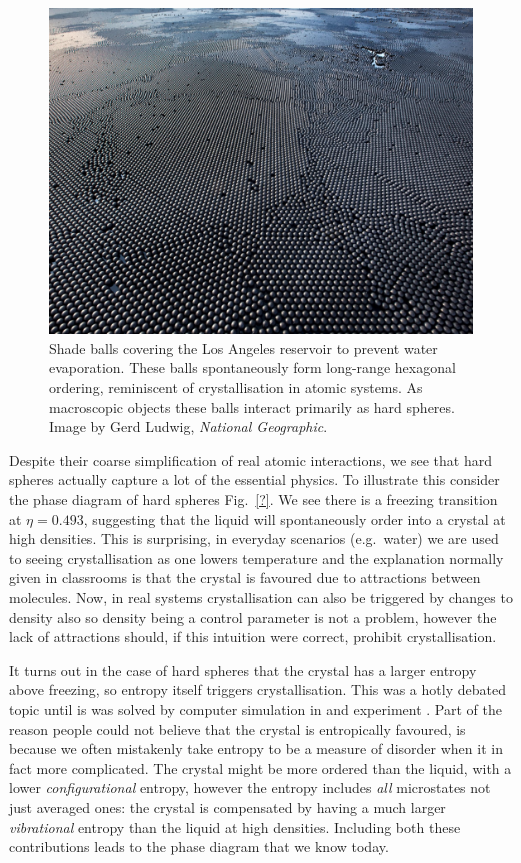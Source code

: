 \documentclass[11pt,twoside]{report}
\begin{document}
\begin{figure}
  \includegraphics[width=\linewidth]{shade-balls}
  \caption{
    Shade balls covering the Los Angeles reservoir to prevent water evaporation.
    These balls spontaneously form long-range hexagonal ordering, reminiscent of crystallisation in atomic systems.
    As macroscopic objects these balls interact primarily as hard spheres.
    Image by Gerd Ludwig, \emph{National Geographic}.}
  \label{fig:shade-balls}
\end{figure}

Despite their coarse simplification of real atomic interactions, we see that hard spheres actually capture a lot of the essential physics.
To illustrate this consider the phase diagram of hard spheres Fig.\ \ref{?}.
We see there is a freezing transition at $\eta = 0.493$, suggesting that the liquid will spontaneously order into a crystal at high densities.
This is surprising, in everyday scenarios (e.g.\ water) we are used to seeing crystallisation as one lowers temperature and the explanation normally given in classrooms is that the crystal is favoured due to attractions between molecules.
Now, in real systems crystallisation can also be triggered by changes to density also so density being a control parameter is not a problem, however the lack of attractions should, if this intuition were correct, prohibit crystallisation.

It turns out in the case of hard spheres that the crystal has a larger entropy above freezing, so entropy itself triggers crystallisation.
This was a hotly debated topic \cite{?,?,?} until is was solved by computer simulation in \cite{?,?,?} and experiment \cite{?,?,?}.
Part of the reason people could not believe that the crystal is entropically favoured, is because we often mistakenly take entropy to be a measure of disorder when it in fact more complicated.
The crystal might be more ordered than the liquid, with a lower \emph{configurational} entropy, however the entropy includes \emph{all} microstates not just averaged ones: the crystal is compensated by having a much larger \emph{vibrational} entropy than the liquid at high densities.
Including both these contributions leads to the phase diagram that we know today.
\end{document}

